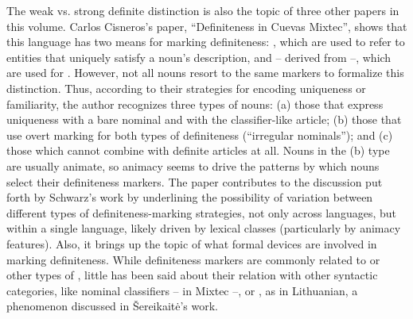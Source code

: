 \documentclass[output=paper]{langsci/langscibook}
\begin{document}
The weak vs. strong definite distinction is also the topic of three other papers in this volume. Carlos Cisneros’s paper, “Definiteness in Cuevas Mixtec”, shows that this  language has two means for marking definiteness: , which are used to refer to entities that uniquely satisfy a noun’s description, and   -- derived from  --, which are used for . However, not all nouns resort to the same markers to formalize this distinction. Thus, according to their strategies for encoding uniqueness or familiarity, the author recognizes three types of nouns: (a) those that express uniqueness with a bare nominal and  with the classifier-like article; (b) those that use overt marking for both types of definiteness (“irregular nominals”); and (c) those which cannot combine with definite articles at all. Nouns in the (b) type are usually animate, so animacy seems to drive the patterns by which nouns select their definiteness markers. The paper contributes to the discussion put forth by Schwarz’s work by underlining the possibility of variation between different types of definiteness-marking strategies, not only across languages, but within a single language, likely driven by lexical classes (particularly by animacy features). Also, it brings up the topic of what formal devices are involved in marking definiteness. While definiteness markers are commonly related to  or other types of , little has been said about their relation with other syntactic categories, like nominal classifiers -- in Mixtec --, or , as in Lithuanian, a phenomenon discussed in Šereikaitė’s work. 
\end{document}
